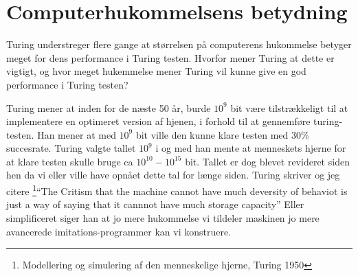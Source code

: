 \section{Computerhukommelsens betydning}
Turing understreger flere gange at størrelsen på computerens hukommelse betyger meget for dens performance i Turing testen. Hvorfor mener Turing at dette er vigtigt, og hvor meget hukemmelse mener Turing vil kunne give en god performance i Turing testen?

Turing mener at inden for de næste 50 år, burde $10^9$ bit være tilstrækkeligt til at implementere en optimeret version af hjenen, i forhold til at gennemføre turing-testen. Han mener at med $10^9$ bit ville den kunne klare testen med 30\% succesrate.
Turing valgte tallet $10^9$ i og med han mente at menneskets hjerne for at klare testen skulle bruge ca $10^{10} - 10^{15}$ bit. 
Tallet er dog blevet revideret siden hen da vi eller ville have opnået dette tal for længe siden.
Turing skriver og jeg citere \footnote{Modellering og simulering af den menneskelige hjerne, Turing 1950}``The Critism that the machine cannot have much deversity of behaviot is just a way of saying that it cannnot have much storage capacity'' Eller simplificeret siger han at jo mere hukommelse vi tildeler maskinen jo mere avancerede imitations-programmer kan vi konstruere.
